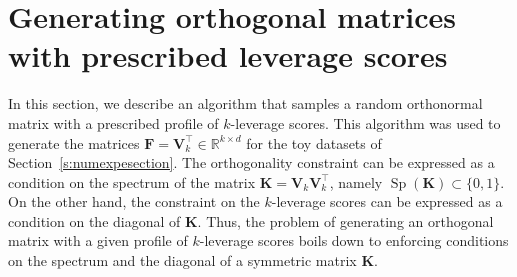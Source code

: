 \documentclass[twoside,11pt]{book}
\numberwithin{theorem}{chapter}
\numberwithin{definition}{chapter}
\numberwithin{proposition}{chapter}
\numberwithin{corollary}{chapter}
\numberwithin{example}{chapter}
\numberwithin{lemma}{chapter}
\numberwithin{assumption}{chapter}
\DeclareMathOperator{\Sp}{\mathrm{Sp}}
\DeclareMathOperator{\Det}{Det}
\DeclareMathOperator{\Tran}{\intercal}
\begin{document}


\section{Generating orthogonal matrices with prescribed leverage scores}
\label{app:framebuilding}


In this section, we describe an algorithm that samples a random orthonormal matrix with a prescribed profile of $k$-leverage scores. This algorithm was used to generate the matrices $\bm{F} = \bm{V}_{k}^{\Tran} \in \mathbb{R}^{k \times d}$ for the toy datasets of Section~\ref{s:numexpesection}. The orthogonality constraint can be expressed as a condition on the spectrum of the matrix $\bm{K} = \bm{V}_{k}^{}\bm{V}_{k}^{\Tran}$, namely $\Sp(\bm{K}) \subset \{0,1\}$. On the other hand, the constraint on the $k$-leverage scores can be expressed as a condition on the diagonal of $\bm{K}$. Thus, the problem of generating an orthogonal matrix with a given profile of $k$-leverage scores boils down to enforcing conditions on the spectrum and the diagonal of a symmetric matrix $\bm{K}$.
\end{document}
